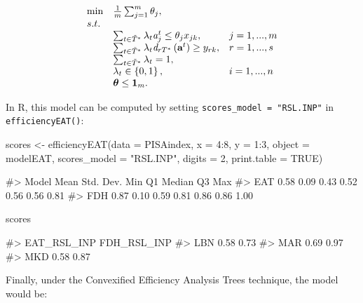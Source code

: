 \begin{equation} \label{(25)} 
\begin{array}{lllll} 
{} & {\min } & {\frac{1}{m} \sum_{j=1}^{m}\theta_{j},  } & {} & {} \\ 
{} & {s.t.} & {} & {} & {} \\ 
{} & {} & {\sum_{t\in \tilde{T}^{*} }^{}\lambda_{t} {\it a}_{j}^{t}  \le \theta_{j} x_{jk} ,} & {j=1,...,m} & {} \\ 
{} & {} & {\sum_{t\in \tilde{T}^{*} }^{}\lambda_{t} {\it d}_{rT^{*}} \left({\it \textbf{a}}^{t} \right) \ge y_{rk} ,} & {r=1,...,s} & {} \\ 
{} & {} & {\sum_{t\in \tilde{T}^{*} }^{}\lambda_{t}=1,} & {} & {} \\ 
{} & {} & {\lambda _{t} \in \left\{0,1\right\},} & {i=1,...,n} & {} \\ 
{} & {} & {{\it \boldsymbol{\theta}}\le {\bf 1}_{m}.}
\end{array} 
\end{equation}

In R, this model can be computed by setting
\texttt{scores\_model\ =\ "RSL.INP"} in \texttt{efficiencyEAT()}:

\begin{Schunk}
\begin{Sinput}
scores <- efficiencyEAT(data = PISAindex, x = 4:8, y = 1:3, object = modelEAT, 
                        scores_model = "RSL.INP", digits = 2, 
                        print.table = TRUE)
\end{Sinput}
\begin{Soutput}
#>  Model Mean Std. Dev.  Min   Q1 Median   Q3  Max
#>    EAT 0.58      0.09 0.43 0.52   0.56 0.56 0.81
#>    FDH 0.87      0.10 0.59 0.81   0.86 0.86 1.00
\end{Soutput}
\begin{Sinput}
scores %>% sample_n(3)
\end{Sinput}
\begin{Soutput}
#>     EAT_RSL_INP FDH_RSL_INP
#> LBN        0.58        0.73
#> MAR        0.69        0.97
#> MKD        0.58        0.87
\end{Soutput}
\end{Schunk}

Finally, under the Convexified Efficiency Analysis Trees technique, the
model would be:

